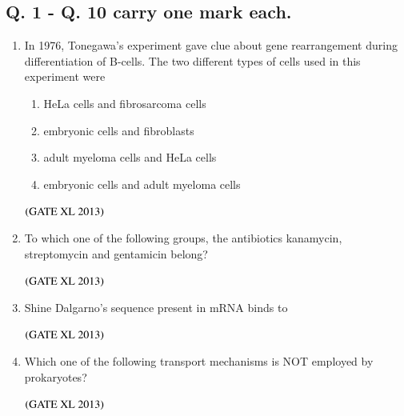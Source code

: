 \documentclass[journal]{IEEEtran}
\begin{document}
\begin{enumerate}
\section*{Q. 1 - Q. 10 carry one mark each.}
\begin{enumerate}[label=\arabic*.]
\item In 1976, Tonegawa's experiment gave clue about gene rearrangement during differentiation of B-cells. The two different types of cells used in this experiment were
\begin{enumerate}
\item HeLa cells and fibrosarcoma cells
\item embryonic cells and fibroblasts
\item adult myeloma cells and HeLa cells
\item embryonic cells and adult myeloma cells
\end{enumerate}
\hfill $\left(\text{GATE XL 2013}\right)$

\item To which one of the following groups, the antibiotics kanamycin, streptomycin and gentamicin belong?
\begin{enumerate}
\end{enumerate}
\hfill $\left(\text{GATE XL 2013}\right)$

\item Shine Dalgarno's sequence present in mRNA binds to
\begin{enumerate}
\end{enumerate}
\hfill $\left(\text{GATE XL 2013}\right)$

\item Which one of the following transport mechanisms is NOT employed by prokaryotes?
\begin{enumerate}
\end{enumerate}
\hfill $\left(\text{GATE XL 2013}\right)$


\end{enumerate}
\end{enumerate}
\end{document}
